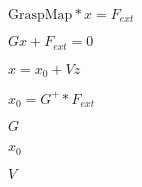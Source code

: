 \documentclass{article}
\begin{document}
$\mbox{GraspMap} * x = F_{ext}$
\pagebreak

$ G x + F_{ext} = 0 $
\pagebreak

$ x = x_0 + V z $
\pagebreak

$ x_0 = G^+ * F_{ext} $
\pagebreak

$G$
\pagebreak

$x_0$
\pagebreak

$V$
\pagebreak
\end{document}
